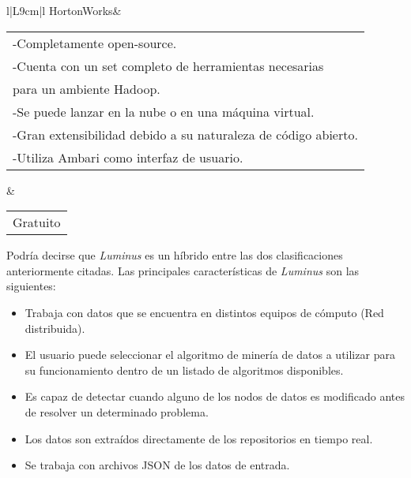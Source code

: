 \begin{itemize}
\begin{table}[H]
\begin{tabular}{l|L{9cm}|l}
		\hline
			HortonWorks& \begin{tabular}[c]{@{}l@{}}-Completamente open-source.\\ -Cuenta con un set completo de herramientas necesarias \\para un ambiente Hadoop.\\ -Se puede lanzar en la nube o en una máquina virtual.\\ -Gran extensibilidad debido a su naturaleza de código abierto.\\ -Utiliza Ambari como interfaz de usuario. \cite{infoHortonworks}\\ \end{tabular} & \begin{tabular}[c]{@{}l@{}} Gratuito \cite{precioHortonworks}\\ \end{tabular}

		\end{tabular}
	\end{table}
\end{itemize}

Podría decirse que \emph{Luminus} es un híbrido entre las dos clasificaciones anteriormente citadas. Las principales características de \emph{Luminus} son las siguientes:
\begin{itemize}
	\item Trabaja con datos que se encuentra en distintos equipos de cómputo (Red distribuida).\\ 
	\item El usuario puede seleccionar el algoritmo de minería de datos a utilizar para su funcionamiento dentro de un listado de algoritmos disponibles.\\ 
	\item Es capaz de detectar cuando alguno de los nodos de datos es modificado antes de resolver un determinado problema.\\
	\item Los datos son extraídos directamente de los repositorios en tiempo real.\\
	\item Se trabaja con archivos JSON de los datos de entrada.\\ 
\end{itemize}
